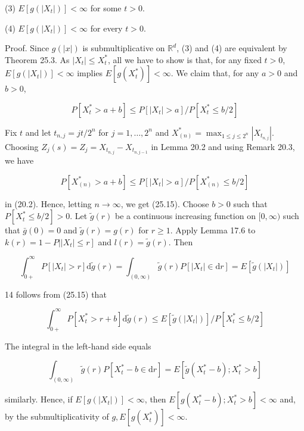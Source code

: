 \documentclass[a4paper,12pt]{article}
\begin{document}
(3) $E\left[g\left(\left|X_{t}\right|\right)\right]<\infty$ for some $t>0$.

(4) $E\left[g\left(\left|X_{t}\right|\right)\right]<\infty$ for every $t>0$.

Proof. Since $g(|x|)$ is submultiplicative on $\mathbb{R}^{d}$, (3) and (4) are equivalent by Theorem 25.3. As $\left|X_{t}\right| \leq X_{t}^{*}$, all we have to show is that, for any fixed $t>0$, $E\left[g\left(\left|X_{t}\right|\right)\right]<\infty$ implies $E\left[g\left(X_{t}^{*}\right)\right]<\infty$. We claim that, for any $a>0$ and $b>0$,


\begin{equation*}
    P\left[X_{t}^{*}>a+b\right] \leq P\left[\left|X_{t}\right|>a\right] / P\left[X_{t}^{*} \leq b / 2\right] \tag{25.15}
\end{equation*}


Fix $t$ and let $t_{n, j}=j t / 2^{n}$ for $j=1, \ldots, 2^{n}$ and $X_{(n)}^{*}=\max _{1 \leq j \leq 2^{n}}\left|X_{t_{n, j}}\right|$. Choosing $Z_{j}(s)=Z_{j}=X_{t_{n, j}}-X_{t_{n, j-1}}$ in Lemma 20.2 and using Remark 20.3, we have

$$
    P\left[X_{(n)}^{*}>a+b\right] \leq P\left[\left|X_{t}\right|>a\right] / P\left[X_{(n)}^{*} \leq b / 2\right]
$$

in (20.2). Hence, letting $n \rightarrow \infty$, we get (25.15). Choose $b>0$ such that $P\left[X_{t}^{*} \leq b / 2\right]>0$. Let $\tilde{g}(r)$ be a continuous increasing function on $[0, \infty)$ such that $\bar{g}(0)=0$ and $\tilde{g}(r)=g(r)$ for $r \geq 1$. Apply Lemma 17.6 to $\left.k(r)=1-P|| X_{t} \mid \leq r\right]$ and $l(r)=\tilde{g}(r)$. Then

$$
    \int_{0+}^{\infty} P\left[\left|X_{t}\right|>r\right] \mathrm{d} \tilde{g}(r)=\int_{(0, \infty)} \tilde{g}(r) P\left[\left|X_{t}\right| \in \mathrm{d} r\right]=E\left[\widetilde{g}\left(\left|X_{t}\right|\right)\right]
$$

14 follows from (25.15) that

$$
    \int_{0+}^{\infty} P\left[X_{t}^{*}>r+b\right] \mathrm{d} \widetilde{g}(r) \leq E\left[\widetilde{g}\left(\left|X_{t}\right|\right)\right] / P\left[X_{t}^{*} \leq b / 2\right]
$$

The integral in the left-hand side equals

$$
    \int_{(0, \infty)} \tilde{g}(r) P\left[X_{t}^{*}-b \in \mathrm{d} r\right]=E\left[\tilde{g}\left(X_{t}^{*}-b\right) ; X_{t}^{*}>b\right]
$$

similarly. Hence, if $E\left[g\left(\left|X_{t}\right|\right)\right]<\infty$, then $E\left[g\left(X_{t}^{*}-b\right) ; X_{t}^{*}>b\right]<\infty$ and, by the submultiplicativity of $g, E\left[g\left(X_{t}^{*}\right)\right]<\infty$.
\end{document}
